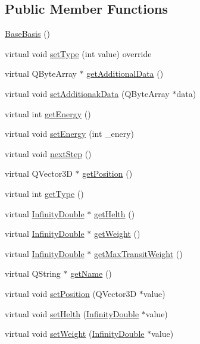 \subsection*{Public Member Functions}
\begin{DoxyCompactItemize}
\item 
\hyperlink{a00149_aa3c0b1cd0f29db8b63bb22dbfb78bbc5}{Base\+Basis} ()
\item 
virtual void \hyperlink{a00149_ac31b2ea48f47f1bc2baaf1971243b506}{set\+Type} (int value) override
\item 
virtual Q\+Byte\+Array $\ast$ \hyperlink{a00149_aaf8b691c26fbbda7878c22dfda32ebe4}{get\+Additional\+Data} ()
\item 
virtual void \hyperlink{a00149_a17b5facef5ea0c9bb9c558a90831d6f9}{set\+Additionak\+Data} (Q\+Byte\+Array $\ast$data)
\item 
virtual int \hyperlink{a00149_acdc9310424ab117e3490e032028a2a7d}{get\+Energy} ()
\item 
virtual void \hyperlink{a00149_a8f4de08926ac9bf0968af49f1ac1279e}{set\+Energy} (int \+\_\+enery)
\item 
virtual void \hyperlink{a00137_ae2be75da1a2a9edfabe993770e24654a}{next\+Step} ()
\item 
virtual Q\+Vector3D $\ast$ \hyperlink{a00137_a3159c02c1118989e3476b52d89a52401}{get\+Position} ()
\item 
virtual int \hyperlink{a00137_a639bd1e233821ff606bb8fe2931f6ee7}{get\+Type} ()
\item 
virtual \hyperlink{a00161}{Infinity\+Double} $\ast$ \hyperlink{a00137_a13a00e39ece3e20e3f5e049224da8d40}{get\+Helth} ()
\item 
virtual \hyperlink{a00161}{Infinity\+Double} $\ast$ \hyperlink{a00137_a935a07134430bbb44c3214629d607a3d}{get\+Weight} ()
\item 
virtual \hyperlink{a00161}{Infinity\+Double} $\ast$ \hyperlink{a00137_a4c74c903e19ada9da9150cf9569b4e9d}{get\+Max\+Transit\+Weight} ()
\item 
virtual Q\+String $\ast$ \hyperlink{a00137_a01051b9a502128a82f9a168a14d1ecdc}{get\+Name} ()
\item 
virtual void \hyperlink{a00137_a54dc1a743fac99db03c3f47b5c6d69c4}{set\+Position} (Q\+Vector3D $\ast$value)
\item 
virtual void \hyperlink{a00137_a2f95e7a61b5db7f2fbbfd32ff786f58c}{set\+Helth} (\hyperlink{a00161}{Infinity\+Double} $\ast$value)
\item 
virtual void \hyperlink{a00137_a4b5e42aa7985c9bf959f0275cbc1bac7}{set\+Weight} (\hyperlink{a00161}{Infinity\+Double} $\ast$value)

\end{DoxyCompactItemize}
